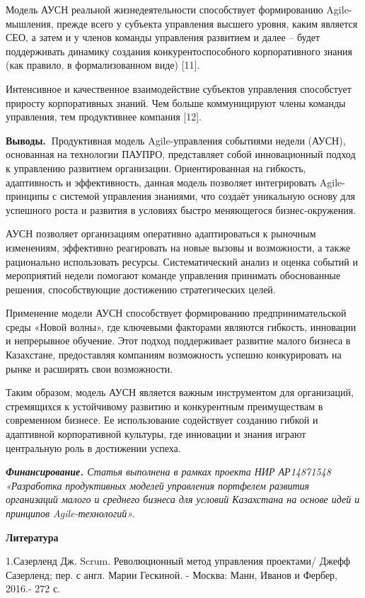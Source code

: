 Модель АУСН реальной жизнедеятельности способствует формированию
Agile-мышления, прежде всего у субъекта управления высшего уровня, каким
является СЕО, а затем и у членов команды управления развитием и далее --
будет поддерживать динамику создания конкурентоспособного корпоративного
знания (как правило, в формализованном виде) {[}11{]}.

Интенсивное и качественное взаимодействие субъектов управления
способстует приросту корпоративных знаний. Чем больше коммуницируют
члены команды управления, тем продуктивнее компания {[}12{]}.

{\bfseries Выводы.~}Продуктивная модель Agile-управления событиями недели
(АУСН), основанная на технологии ПАУПРО, представляет собой
инновационный подход к управлению развитием организации. Ориентированная
на гибкость, адаптивность и эффективность, данная модель позволяет
интегрировать Agile-принципы с системой управления знаниями, что создаёт
уникальную основу для успешного роста и развития в условиях быстро
меняющегося бизнес-окружения.

АУСН позволяет организациям оперативно адаптироваться к рыночным
изменениям, эффективно реагировать на новые вызовы и возможности, а
также рационально использовать ресурсы. Систематический анализ и оценка
событий и мероприятий недели помогают команде управления принимать
обоснованные решения, способствующие достижению стратегических целей.

Применение модели АУСН способствует формированию предпринимательской
среды «Новой волны», где ключевыми факторами являются гибкость,
инновации и непрерывное обучение. Этот подход поддерживает развитие
малого бизнеса в Казахстане, предоставляя компаниям возможность успешно
конкурировать на рынке и расширять свои возможности.

Таким образом, модель АУСН является важным инструментом для организаций,
стремящихся к устойчивому развитию и конкурентным преимуществам в
современном бизнесе. Ее использование содействует созданию гибкой и
адаптивной корпоративной культуры, где инновации и знания играют
центральную роль в достижении успеха.

\emph{{\bfseries Финансирование.} Статья выполнена в рамках проекта НИР
АР14871548 «}\emph{Разработка} \emph{продуктивных моделей}
\emph{управления портфелем развития организаций малого и среднего
бизнеса для условий Казахстана на основе идей и принципов
Agile-технологий».}

{\bfseries Литература}

1.Сазерленд Дж. Scrum. Революционный метод управления проектами/ Джефф
Сазерленд; пер. с англ. Марии Гескиной. - Москва: Манн, Иванов и Фербер,
2016.- 272 с.

